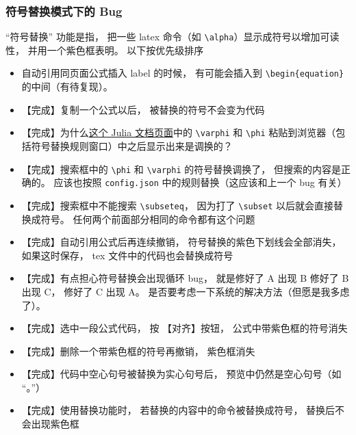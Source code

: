\subsubsection{符号替换模式下的 Bug}
“符号替换” 功能是指， 把一些 latex 命令（如 \verb`\alpha`）显示成符号以增加可读性， 并用一个紫色框表明。 以下按优先级排序
\begin{itemize}
\item 自动引用同页面公式插入 label 的时候， 有可能会插入到 \verb`\begin{equation}` 的中间（有待复现）。

\item 【完成】复制一个公式以后， 被替换的符号不会变为代码

\item 【完成】为什么\href{https://docs.julialang.org/en/v1/manual/unicode-input/}{这个 Julia 文档页面}中的 \lstinline|\varphi| 和 \lstinline|\phi| 粘贴到浏览器（包括符号替换规则窗口）中之后显示出来是调换的？

\item 【完成】搜索框中的 \lstinline|\phi| 和 \lstinline|\varphi| 的符号替换调换了， 但搜索的内容是正确的。 应该也按照 \lstinline|config.json| 中的规则替换（这应该和上一个 bug 有关）

\item 【完成】搜索框中不能搜索 \lstinline|\subseteq|， 因为打了 \lstinline|\subset| 以后就会直接替换成符号。 任何两个前面部分相同的命令都有这个问题

\item 【完成】自动引用公式后再连续撤销， 符号替换的紫色下划线会全部消失， 如果这时保存， tex 文件中的代码也会替换成符号

\item 【完成】有点担心符号替换会出现循环 bug， 就是修好了 A 出现 B 修好了 B 出现 C， 修好了 C 出现 A。 是否要考虑一下系统的解决方法（但愿是我多虑了）。

\item 【完成】选中一段公式代码， 按 【对齐】按钮， 公式中带紫色框的符号消失

\item 【完成】删除一个带紫色框的符号再撤销， 紫色框消失

\item 【完成】代码中空心句号被替换为实心句号后， 预览中仍然是空心句号（如 “。”）

\item 【完成】使用替换功能时， 若替换的内容中的命令被替换成符号， 替换后不会出现紫色框
\end{itemize}

